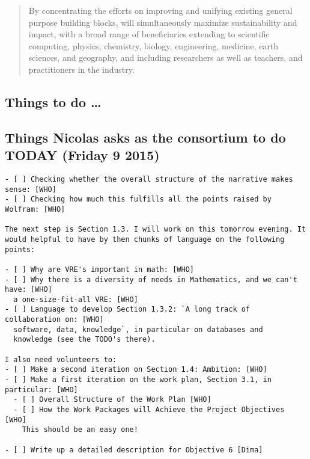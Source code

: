 \documentclass[noworkareas,deliverables,\classoptions]{euproposal}       %
\begin{document}
\begin{proposal}
\begin{abstract}
  By concentrating the efforts on improving and unifying existing
  general purpose building blocks, \TheProject will simultaneously
  maximize sustainability and impact, with a broad range of
  beneficiaries extending to scientific computing, physics, chemistry,
  biology, engineering, medicine, earth sciences, and geography, and
  including researchers as well as teachers, and practitioners in the
  industry.

\end{abstract}
\ifsubmit\else\setcounter{tocdepth}{4}\fi
\tableofcontents



\begin{draft}
\section*{Things to do \dots}
\subsection*{Things Nicolas asks as the consortium to do TODAY (Friday 9 2015)}
\begin{verbatim}
- [ ] Checking whether the overall structure of the narrative makes sense: [WHO]
- [ ] Checking how much this fulfills all the points raised by Wolfram: [WHO]

The next step is Section 1.3. I will work on this tomorrow evening. It
would helpful to have by then chunks of language on the following points:

- [ ] Why are VRE's important in math: [WHO]
- [ ] Why there is a diversity of needs in Mathematics, and we can't have: [WHO]
  a one-size-fit-all VRE: [WHO]
- [ ] Language to develop Section 1.3.2: `A long track of collaboration on: [WHO]
  software, data, knowledge`, in particular on databases and
  knowledge (see the TODO's there).

I also need volunteers to:
- [ ] Make a second iteration on Section 1.4: Ambition: [WHO]
- [ ] Make a first iteration on the work plan, Section 3.1, in particular: [WHO]
  - [ ] Overall Structure of the Work Plan [WHO]
  - [ ] How the Work Packages will Achieve the Project Objectives [WHO]
    This should be an easy one!

- [ ] Write up a detailed description for Objective 6 [Dima]
\end{verbatim}


\end{draft}
\end{proposal}
\end{document}
